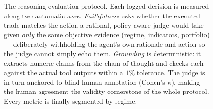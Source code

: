 \begin{figure}[t]
  \caption[Reasoning-evaluation protocol]{The reasoning-evaluation protocol. Each logged
  decision is measured along two automatic axes. \emph{Faithfulness} asks whether the
  executed trade matches the action a rational, policy-aware judge would take given
  \emph{only} the same objective evidence (regime, indicators, portfolio) --- deliberately
  withholding the agent's own rationale and action so the judge cannot simply echo them.
  \emph{Grounding} is deterministic: it extracts numeric claims from the chain-of-thought
  and checks each against the actual tool outputs within a $1\%$ tolerance. The judge is in
  turn anchored to blind human annotation (Cohen's $\kappa$), making the human agreement the
  validity cornerstone of the whole protocol. Every metric is finally segmented by regime.}
  \label{fig:evalprotocol}
\end{figure}
